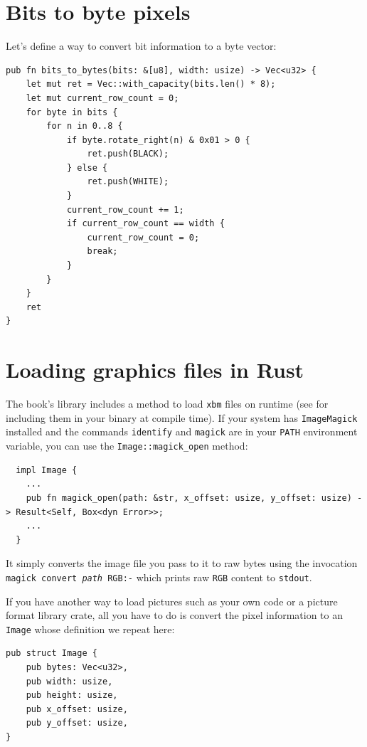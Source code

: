 \documentclass[12pt,openany,a4,usenames,dvipsnames]{book}
\newcommand\pixels{{\pixelfont{}pixels}}
\newcommand\Rust{{\fira{}\textbf{Rust}}}
\begin{document}
\chapter{Bits to byte \pixels{}}\label{ch:bitstobytes}
Let's define a way to convert bit information to a byte vector:

\begin{verbatim}
pub fn bits_to_bytes(bits: &[u8], width: usize) -> Vec<u32> {
    let mut ret = Vec::with_capacity(bits.len() * 8);
    let mut current_row_count = 0;
    for byte in bits {
        for n in 0..8 {
            if byte.rotate_right(n) & 0x01 > 0 {
                ret.push(BLACK);
            } else {
                ret.push(WHITE);
            }
            current_row_count += 1;
            if current_row_count == width {
                current_row_count = 0;
                break;
            }
        }
    }
    ret
}
\end{verbatim}

\chapter{Loading graphics files in \Rust{}}
The book's library includes a method to load \texttt{xbm} files on runtime (see \emph{} for including them in your binary at compile time). If your system has \texttt{ImageMagick} installed and the commands \texttt{identify} and \texttt{magick} are in your \texttt{PATH} environment variable, you can use the \texttt{Image::magick\_open} method:

\begin{verbatim}
  impl Image {
    ...
    pub fn magick_open(path: &str, x_offset: usize, y_offset: usize) -> Result<Self, Box<dyn Error>>;
    ...
  }
\end{verbatim}

It simply converts the image file you pass to it to raw bytes using the invocation \texttt{magick convert \emph{path} RGB:-} which prints raw \texttt{RGB} content to \texttt{stdout}.

If you have another way to load pictures such as your own code or a picture format library crate, all you have to do is convert the pixel information to an \texttt{Image} whose definition we repeat here:

\begin{verbatim}
pub struct Image {
    pub bytes: Vec<u32>,
    pub width: usize,
    pub height: usize,
    pub x_offset: usize,
    pub y_offset: usize,
}
\end{verbatim}
\end{document}
